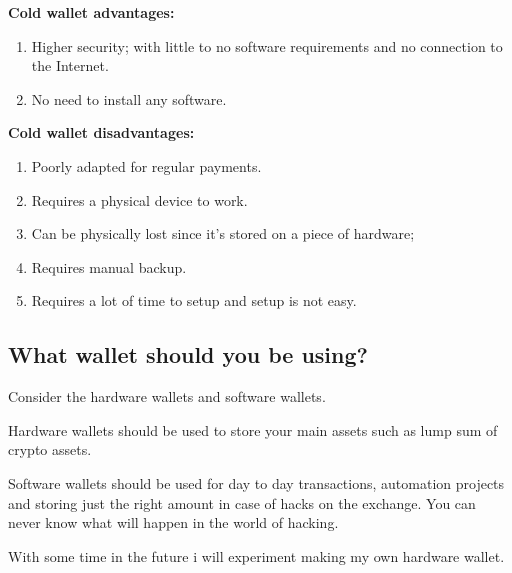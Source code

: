 \textbf{Cold wallet advantages:}
\begin{enumerate}
    \item Higher security; with little to no software requirements and no connection to the Internet. \\
    \item No need to install any software. \\    
\end{enumerate}    

\textbf{Cold wallet disadvantages:}
\begin{enumerate} 
    \item Poorly adapted for regular payments.
    \item Requires a physical device to work.
    \item Can be physically lost since it’s stored on a piece of hardware;
    \item Requires manual backup.
    \item Requires a lot of time to setup and setup is not easy.
\end{enumerate}    

\subsection{What wallet should you be using?}

Consider the hardware wallets and software wallets. 

Hardware wallets should be used to store your main assets such as lump sum of crypto assets. 

Software wallets should be used for day to day transactions, automation projects and storing just the right amount in case of hacks on the exchange. You can never know what will happen in the world of hacking.

With some time in the future i will experiment making my own hardware wallet.








